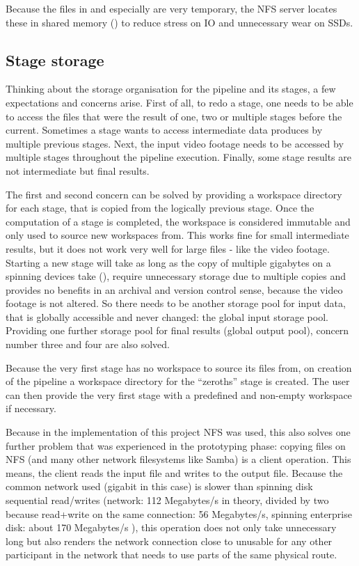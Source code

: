 Because the files in  and especially  are very temporary, the NFS server locates these in shared memory () to reduce stress on IO and unnecessary wear on SSDs.

\subsection{Stage storage}
\label{stage:workspace}


Thinking about the storage organisation for the pipeline and its stages, a few expectations and concerns arise.
First of all, to redo a stage, one needs to be able to access the files that were the result of one, two or multiple stages before the current.
Sometimes a stage wants to access intermediate data produces by multiple previous stages.
Next, the input video footage needs to be accessed by multiple stages throughout the pipeline execution.
Finally, some stage results are not intermediate but final results.

The first and second concern can be solved by providing a workspace directory for each stage, that is copied from the logically previous stage.
Once the computation of a stage is completed, the workspace is considered immutable and only used to source new workspaces from.
This works fine for small intermediate results, but it does not work very well for large files - like the video footage.
Starting a new stage will take as long as the copy of multiple gigabytes on a spinning devices take (), require unnecessary storage due to multiple copies and provides no benefits in an archival and version control sense, because the video footage is not altered.
So there needs to be another storage pool for input data, that is globally accessible and never changed: the global input storage pool.
Providing one further storage pool for final results (global output pool), concern number three and four are also solved.

Because the very first stage has no workspace to source its files from, on creation of the pipeline a workspace directory for the \enquote{zeroths} stage is created.
The user can then provide the very first stage with a predefined and non-empty workspace if necessary.

Because in the implementation of this project NFS was used, this also solves one further problem that was experienced in the prototyping phase: copying files on NFS (and many other network filesystems like Samba) is a client operation.
This means, the client reads the input file and writes to the output file.
Because the common network used (gigabit in this case) is slower than spinning disk sequential read/writes (network: 112 Megabytes/s in theory, divided by two because read+write on the same connection: 56 Megabytes/s, spinning enterprise disk: about 170 Megabytes/s ), this operation does not only take unnecessary long but also renders the network connection close to unusable for any other participant in the network that needs to use parts of the same physical route.

